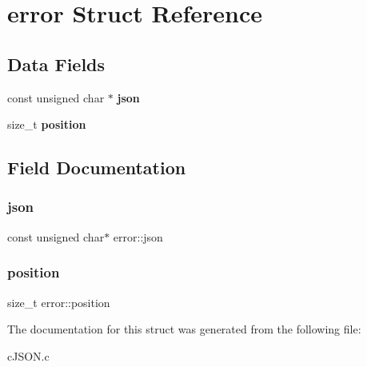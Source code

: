 \hypertarget{structerror}{}\section{error Struct Reference}
\label{structerror}
\subsection*{Data Fields}
\begin{DoxyCompactItemize}
\item 
\mbox{\label{structerror_a9b123855d5dd48e86de846588462b39f}} 
const unsigned char $\ast$ {\bfseries json}
\item 
\mbox{\label{structerror_a24de70a4d517ab351d80c18582cadb66}} 
size\+\_\+t {\bfseries position}
\end{DoxyCompactItemize}


\subsection{Field Documentation}
\mbox{\label{structerror_a9b123855d5dd48e86de846588462b39f}} 
\subsubsection{\texorpdfstring{json}{json}}
{\footnotesize\ttfamily const unsigned char$\ast$ error\+::json}

\mbox{\label{structerror_a24de70a4d517ab351d80c18582cadb66}} 
\subsubsection{\texorpdfstring{position}{position}}
{\footnotesize\ttfamily size\+\_\+t error\+::position}



The documentation for this struct was generated from the following file\+:\begin{DoxyCompactItemize}
\item 
c\+J\+S\+O\+N.\+c\end{DoxyCompactItemize}

